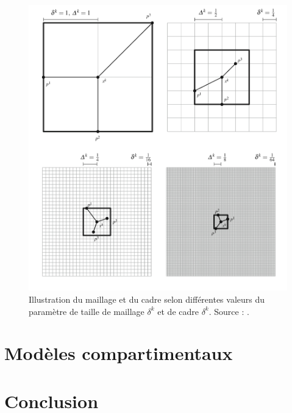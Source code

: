 \documentclass[french]{report}
\begin{document}
\begin{figure}
    \centering
    \includegraphics[width=13cm]{MADS_illustration.jpg}
    \caption{Illustration du maillage et du cadre selon différentes valeurs du paramètre de taille de maillage $\delta^k$ et de cadre $\delta^k$. Source : \cite{AuHa2017a}.}
    \label{fig:MADS illustration}
\end{figure}




\chapter{Modèles compartimentaux}

\chapter*{Conclusion}




\end{document}
